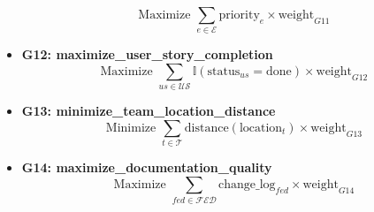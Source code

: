 \documentclass{article}
\begin{document}
\begin{itemize}
    \[
    \text{Maximize } \sum_{e \in \mathcal{E}} \text{priority}_e \times \text{weight}_{G11}
    \]
    \item \textbf{G12: maximize\_user\_story\_completion}
    \[
    \text{Maximize } \sum_{us \in \mathcal{US}} \mathbb{I}(\text{status}_{us} = \text{done}) \times \text{weight}_{G12}
    \]
    \item \textbf{G13: minimize\_team\_location\_distance}
    \[
    \text{Minimize } \sum_{t \in \mathcal{T}} \text{distance}(\text{location}_t) \times \text{weight}_{G13}
    \]
    \item \textbf{G14: maximize\_documentation\_quality}
    \[
    \text{Maximize } \sum_{fed \in \mathcal{FED}} \text{change\_log}_{fed} \times \text{weight}_{G14}
    \]
\end{itemize}
\end{document}

